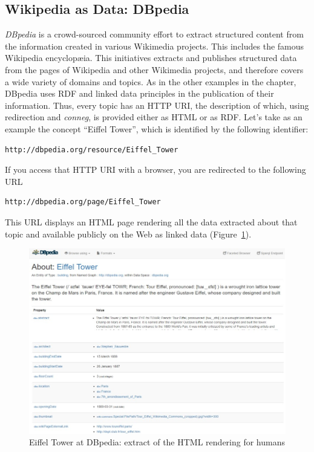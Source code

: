 \subsection{Wikipedia as Data: DBpedia}
\label{dbpedia}

\emph{DBpedia} is a crowd-sourced community effort to extract structured
content from the information created in various Wikimedia projects\cite{Auer:2007:DNW:1785162.1785216}. 
This includes the famous Wikipedia encyclop{\ae}ia.  This initiatives extracts
and publishes structured data from the pages of Wikipedia
and other Wikimedia projects, and therefore covers a wide variety of
domains and topics. As in the other examples in the chapter, DBpedia uses RDF and linked data 
principles in the publication of their information. 
Thus, every topic has an HTTP URI, the description of which, using redirection and \emph{conneg},  
is provided  either as
HTML or as 
RDF. Let's take as an example the concept ``Eiffel Tower'', which is identified by the
following identifier:

\begin{lstlisting}
http://dbpedia.org/resource/Eiffel_Tower
\end{lstlisting}

If you access that HTTP URI with a browser, you are redirected to the
following URL

\begin{lstlisting}
http://dbpedia.org/page/Eiffel_Tower
\end{lstlisting}

This URL displays an HTML page rendering all the data extracted about
that topic and available publicly on the Web as linked data (Figure~\ref{fig:ch5.7}).

\begin{figure}
    \centering
    \includegraphics[width=5in]{media/ch5/figure-05-07.jpg}
    \caption{Eiffel Tower at DBpedia: extract of the HTML rendering for humans}
    \label{fig:ch5.7}
\end{figure}


